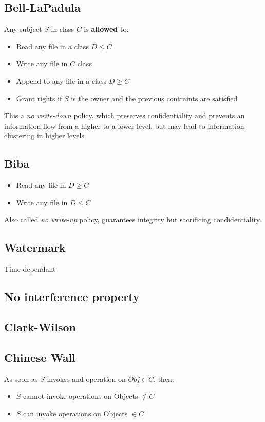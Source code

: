 \subsection{Bell-LaPadula}
Any subject $S$ in class $C$ is \textbf{allowed} to:
\begin{itemize}
    \item Read any file in a class $D \leq C$
    \item Write any file in $C$ class
    \item Append to any file in a class $D \geq C$
    \item Grant rights if $S$ is the owner and the previous contraints are satisfied
\end{itemize}
This a \textit{no write-down} policy, 
which preserves confidentiality and prevents an information flow from a higher to a lower level,
but may lead to information clustering in higher levels

\subsection{Biba}
\begin{itemize}
    \item Read any file in $D \geq C$
    \item Write any file in $D \leq C$
\end{itemize}

Also called \textit{no write-up} policy, guarantees integrity but sacrificing condidentiality.

\subsection{Watermark}
Time-dependant

\subsection{No interference property}

\subsection{Clark-Wilson}

\subsection{Chinese Wall}
As soon as $S$ invokes and operation on $Obj \in C$,
then:
\begin{itemize}
    \item $S$ cannot invoke operations on Objects $ \notin C$
    \item $S$ can invoke operations on Objects $ \in C$
\end{itemize}

